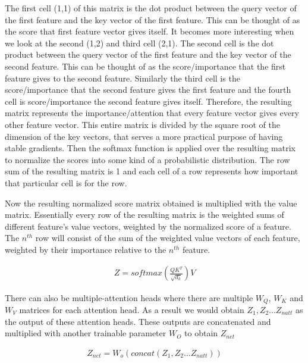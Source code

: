 \documentclass{article}
\begin{document}
The first cell (1,1) of this matrix is the dot product between the query vector of the first feature  and the key vector of the first feature. This can be thought of as the score that first feature vector gives itself. It becomes more interesting when we look at the second (1,2) and third cell (2,1).
The second cell is the dot product between the query vector of the first feature and the key vector of the second feature. This can be thought of as the score/importance that the first feature gives to the second feature. Similarly the third cell is the score/importance that the second feature gives the first feature and the fourth cell is score/importance the second feature gives itself. Therefore, the resulting matrix represents the importance/attention that every feature vector gives every other feature vector. This entire matrix is divided by the square root of the dimension of the key vectors, that serves a more practical purpose of having stable gradients. Then the softmax function is applied over the resulting matrix to normalize the scores into some kind of a probabilistic distribution. The row sum of the resulting matrix is 1 and each cell of a row represents how important that particular cell is for the row. 

Now the resulting normalized score matrix obtained is multiplied with the value matrix. Essentially every row of the resulting matrix is the weighted sums of different feature's value vectors, weighted by the normalized score of a feature. The $n^{th}$ row will consist of the sum of the weighted value vectors of each feature, weighted by their importance relative to the $n^{th}$ feature. 

\begin{equation}
    \begin{split}
        Z=softmax(\frac{QK^T}{\sqrt{d_k}})V
    \end{split}
\end{equation}

There can also be multiple-attention heads where there are multiple $W_Q$, $W_K$ and $W_V$ matrices for each attention head. As a result we would obtain $Z_1, Z_2 ... Z_{natt}$ as the output of these attention heads. These outputs are concatenated and multiplied with another trainable parameter $W_O$ to obtain $Z_{net}$

\begin{equation}
    \begin{split}
        Z_{net}=W_o(concat(Z_1,Z_2...Z_{natt}))
    \end{split}
\end{equation}
\end{document}
